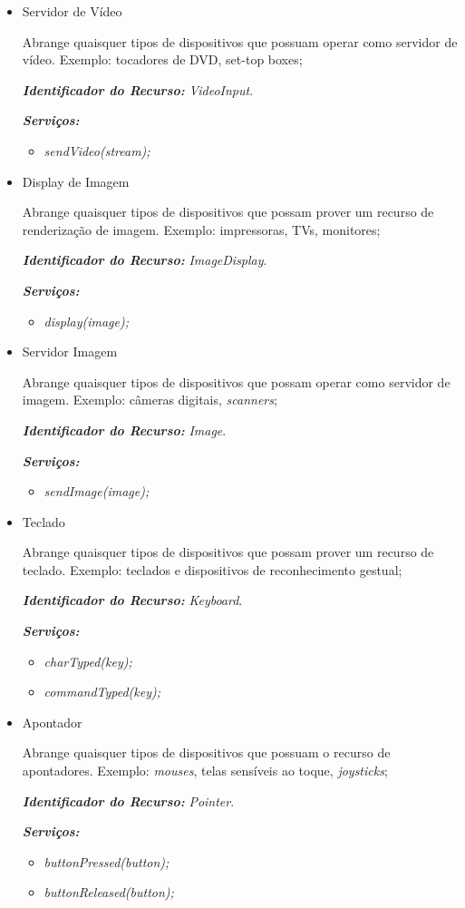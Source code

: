 \begin{itemize}
	\item Servidor de Vídeo
		
		Abrange quaisquer tipos de dispositivos que possuam operar como servidor de vídeo. Exemplo: tocadores de DVD, set-top boxes;

		\emph{\bf{Identificador do Recurso:}} \emph{VideoInput}.

		\emph{\bf{Serviços:}} 
		\begin{itemize}
			\item \emph{sendVideo(stream);}
		\end{itemize}

	\item Display de Imagem
		
		Abrange quaisquer tipos de dispositivos que possam prover um recurso de renderização de imagem. Exemplo: impressoras, TVs, monitores;

		\emph{\bf{Identificador do Recurso:}} \emph{ImageDisplay}.

		\emph{\bf{Serviços:}} 
		\begin{itemize}
			\item \emph{display(image);}
		\end{itemize}

	\item Servidor Imagem
		
		Abrange quaisquer tipos de dispositivos que possam operar como servidor de imagem. Exemplo: câmeras digitais, \emph{scanners};

		\emph{\bf{Identificador do Recurso:}} \emph{Image}.

		\emph{\bf{Serviços:}} 
		\begin{itemize}
			\item \emph{sendImage(image);}
		\end{itemize}
	\item Teclado
		
		Abrange quaisquer tipos de dispositivos que possam prover um recurso de teclado. Exemplo: teclados e dispositivos de reconhecimento gestual;

		\emph{\bf{Identificador do Recurso:}} \emph{Keyboard}.

		\emph{\bf{Serviços:}} 
		\begin{itemize}
			\item \emph{charTyped(key);}
			\item \emph{commandTyped(key);}
		\end{itemize}

	\item Apontador
		
		Abrange quaisquer tipos de dispositivos que possuam o recurso de apontadores. Exemplo: \emph{mouses}, telas sensíveis ao toque, \emph{joysticks};

		\emph{\bf{Identificador do Recurso:}} \emph{Pointer}.

		\emph{\bf{Serviços:}} 
		\begin{itemize}
			\item \emph{buttonPressed(button);}
			\item \emph{buttonReleased(button);}
		\end{itemize}

\end{itemize}

